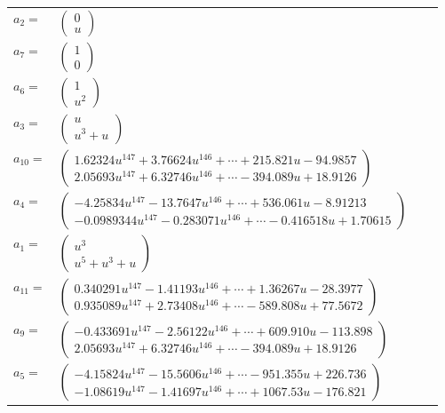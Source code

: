 \documentclass[1p]{elsarticle_modified}
\theoremstyle{definition}
\begin{document}
\begin{tabular}{m{7pt} m{180pt} m{7pt} m{180pt} }
\flushright $a_{2}=$&$\begin{pmatrix}0\\u\end{pmatrix}$ \\
\flushright $a_{7}=$&$\begin{pmatrix}1\\0\end{pmatrix}$ \\
\flushright $a_{6}=$&$\begin{pmatrix}1\\u^2\end{pmatrix}$ \\
\flushright $a_{3}=$&$\begin{pmatrix}u\\u^3+u\end{pmatrix}$ \\
\flushright $a_{10}=$&$\begin{pmatrix}1.62324 u^{147}+3.76624 u^{146}+\cdots+215.821 u-94.9857\\2.05693 u^{147}+6.32746 u^{146}+\cdots-394.089 u+18.9126\end{pmatrix}$ \\
\flushright $a_{4}=$&$\begin{pmatrix}-4.25834 u^{147}-13.7647 u^{146}+\cdots+536.061 u-8.91213\\-0.0989344 u^{147}-0.283071 u^{146}+\cdots-0.416518 u+1.70615\end{pmatrix}$ \\
\flushright $a_{1}=$&$\begin{pmatrix}u^3\\u^5+u^3+u\end{pmatrix}$ \\
\flushright $a_{11}=$&$\begin{pmatrix}0.340291 u^{147}-1.41193 u^{146}+\cdots+1.36267 u-28.3977\\0.935089 u^{147}+2.73408 u^{146}+\cdots-589.808 u+77.5672\end{pmatrix}$ \\
\flushright $a_{9}=$&$\begin{pmatrix}-0.433691 u^{147}-2.56122 u^{146}+\cdots+609.910 u-113.898\\2.05693 u^{147}+6.32746 u^{146}+\cdots-394.089 u+18.9126\end{pmatrix}$ \\
\flushright $a_{5}=$&$\begin{pmatrix}-4.15824 u^{147}-15.5606 u^{146}+\cdots-951.355 u+226.736\\-1.08619 u^{147}-1.41697 u^{146}+\cdots+1067.53 u-176.821\end{pmatrix}$ \\

\end{tabular}
\end{document}
